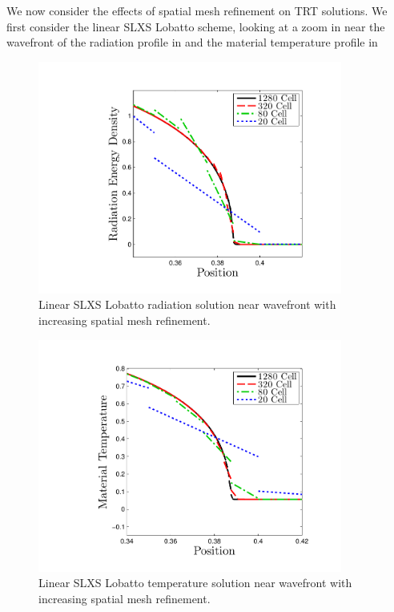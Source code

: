 We now consider the effects of spatial mesh refinement on TRT solutions.  
We first consider the linear SLXS Lobatto scheme, looking at a zoom in near the wavefront of the radiation profile in  and the material temperature profile in 
\begin{figure}[!hbp]
\centering
\includegraphics[width=10cm,trim=1.0in  0.2in 0.5in 0.5in,clip=true]{chapter6_grey_radtran/Dissertation_Data/Reorder_Marshak_Zoom_Radiation_SL_Lobatto_P1_Cell_Refinement.pdf}
\caption{Linear SLXS Lobatto radiation solution near wavefront with increasing spatial mesh refinement.}
\label{fig:lobatto_convergence_rad}
\end{figure}
%
%
\begin{figure}[!htp]
\centering
\includegraphics[width=10cm,trim=1.0in  0.2in 0.5in 0.5in,clip=true]{chapter6_grey_radtran/Dissertation_Data/Reorder_Marshak_Zoom_Temperature_SL_Lobatto_P1_Cell_Refinement.pdf}
\caption{Linear SLXS Lobatto temperature solution near wavefront with increasing spatial mesh refinement.}
\label{fig:lobatto_convergence_temp}
\end{figure}
